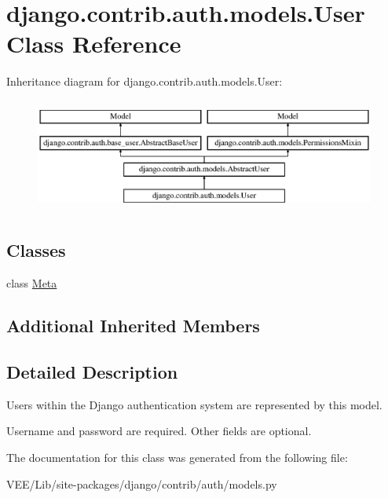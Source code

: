 \hypertarget{classdjango_1_1contrib_1_1auth_1_1models_1_1_user}{}\section{django.\+contrib.\+auth.\+models.\+User Class Reference}
\label{classdjango_1_1contrib_1_1auth_1_1models_1_1_user}
Inheritance diagram for django.\+contrib.\+auth.\+models.\+User\+:\begin{figure}[H]
\begin{center}
\leavevmode
\includegraphics[height=3.771044cm]{classdjango_1_1contrib_1_1auth_1_1models_1_1_user}
\end{center}
\end{figure}
\subsection*{Classes}
\begin{DoxyCompactItemize}
\item 
class \mbox{\hyperlink{classdjango_1_1contrib_1_1auth_1_1models_1_1_user_1_1_meta}{Meta}}
\end{DoxyCompactItemize}
\subsection*{Additional Inherited Members}


\subsection{Detailed Description}
\begin{DoxyVerb}Users within the Django authentication system are represented by this
model.

Username and password are required. Other fields are optional.
\end{DoxyVerb}
 

The documentation for this class was generated from the following file\+:\begin{DoxyCompactItemize}
\item 
V\+E\+E/\+Lib/site-\/packages/django/contrib/auth/models.\+py\end{DoxyCompactItemize}

